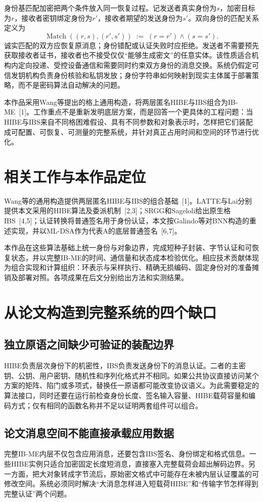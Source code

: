 \documentclass[UTF8,a4paper,12pt,oneside,openany,fontset=fandol]{ctexrep}
\begin{document}
身份基匹配加密把两个条件放入同一恢复过程。记发送者真实身份为\(s\)，加密目标为\(r\)，接收者密钥绑定身份为\(r'\)，接收者期望的发送身份为\(s'\)。双向身份的匹配关系定义为
\[
  \operatorname{Match}((r,s),(r',s'))\;:=\;(r=r')\land(s=s').
\]
诚实匹配的双方应恢复原消息；身份错配或认证失败时应拒绝。发送者不需要预先获取接收者证书，接收者也不接受仅仅“能够生成密文”的任意实体。该性质适合机构内定向投递、受控设备通信和需要同时约束双方身份的消息交换。系统仍假定可信发钥机构负责身份核验和私钥发放；身份字符串如何映射到现实主体属于部署策略，而不是密码算法自动解决的问题。

本作品采用Wang等提出的格上通用构造，将两层匿名HIBE与IBS组合为IB-ME~[1]。工作重点不是重新发明底层方案，而是回答一个更具体的工程问题：当HIBE与IBS来自不同格困难假设、具有不同参数和对象表示时，怎样把它们装配成可配置、可恢复、可测量的完整系统，并针对真正占用时间和空间的环节进行优化。

\section{相关工作与本作品定位}
Wang等的通用构造提供两层匿名HIBE与IBS的组合基础~[1]。LATTE与Lai分别提供本文采用的HIBE算法及委派机制~[2,3]；SRGG和Sageloli给出原生格IBS~[4,5]；认证转换将普通签名用于身份认证，本文按Galindo等对BNN构造的重述实现，并以ML-DSA作为代表A的底层普通签名~[6,7]。

本作品在这些算法基础上统一身份与对象边界，完成短种子封装、字节认证和可恢复状态，并以完整IB-ME的时间、通信量和状态成本检验优化。相应技术贡献体现为组合实现和计算组织：环表示与采样执行、精确无损编码、固定身份对的准备摊销及部署对照。各项成果在后文分别给出方法和实测结果。

\section{从论文构造到完整系统的四个缺口}

\subsection{独立原语之间缺少可验证的装配边界}
HIBE负责层次身份下的机密性，IBS负责发送身份下的消息认证。二者的主密钥、公钥、用户密钥、随机性和序列化格式并不相同。如果公共协议直接访问某个方案的矩阵、陷门或多项式，替换任一原语都可能改变协议语义。为此需要稳定的算法接口，同时还要在运行前检查身份长度、签名输入容量、HIBE载荷容量和编码方式；仅有相同的函数名称并不足以证明两套组件可以组合。

\subsection{论文消息空间不能直接承载应用数据}
完整IB-ME内层不仅包含应用消息，还要包含IBS签名、身份绑定和格式信息。一些HIBE实例只适合加密固定长度短消息，直接塞入完整载荷会超出解码边界。另一方面，把大对象转成字节流后，原始密文格式中可能存在未被内层认证覆盖的可修改空间。系统必须同时解决“大消息怎样进入短载荷HIBE”和“传输字节怎样得到完整认证”两个问题。
\end{document}
